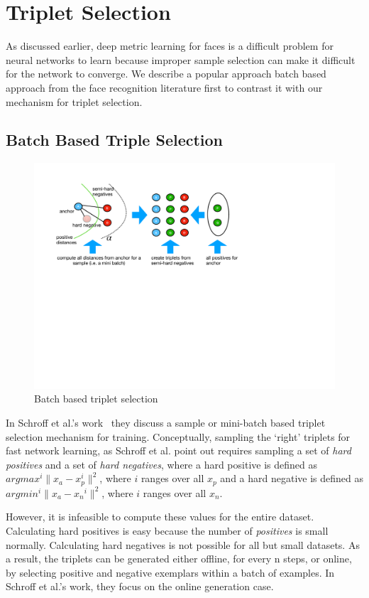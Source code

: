 \section{Triplet Selection}
As discussed earlier, deep metric learning for faces is a difficult problem for neural networks to learn because improper sample selection can make it difficult for the network to converge.  We describe a popular approach batch based approach from the face recognition literature first to contrast it with our mechanism for triplet selection.

\subsection{Batch Based Triple Selection}
\begin{figure}
\includegraphics[width=1.0\linewidth]{triplet_selection}
\caption{Batch based triplet selection}
\label{triplet_selection}
\end{figure}

In Schroff et al.'s work~\cite{DBLP:conf/cvpr/SchroffKP15} they discuss a sample or mini-batch based triplet selection mechanism for training.  Conceptually, sampling the `right' triplets for fast network learning, as Schroff et al. point out requires sampling a set of \textit{hard positives} and a set of \textit{hard negatives}, where a hard positive is defined as $argmax^i \| x_{a} - x_{p}^i \|^2$, where $i$ ranges over all $x_p$ and a hard negative is defined as $argmin^i \| x_{a} - x{_n}^i \|^2$, where $i$ ranges over all $x_n$. 

However, it is infeasible to compute these values for the entire dataset.  Calculating hard positives is easy because the number of \textit{positives} is small normally.  Calculating hard negatives is not possible for all but small datasets.  As a result, the triplets can be generated either offline, for every n steps, or online, by selecting positive and negative exemplars within a batch of examples.  In Schroff et al.'s work, they focus on the online generation case.  

